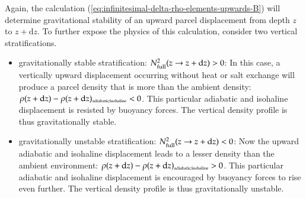 Again, the calculation
(\ref{eq:infinitesimal-delta-rho-elements-upwards-B}) will determine
gravitational stability of an upward parcel displacement from depth
$z$ to $z+\mathrm{d}z$.  To further expose the physics of this
calculation, consider two vertical stratifications.
\begin{itemize}
\item {\sc gravitationally stable stratification:
    $N^{2}_{\mbox{\scriptsize full}}(z \rightarrow z+\mathrm{d}z) >
    0$}: In this case, a vertically upward displacement occurring
  without heat or salt exchange will produce a parcel density that is
  more than the ambient density: $\rho(z+\mathrm{d} z) -
  \rho(z+\mathrm{d} z)_{\mbox{\tiny adiabatic/isohaline}} <0$. This
  particular adiabatic and isohaline displacement is resisted by
  buoyancy forces.  The vertical density profile is thus
  gravitationally stable.

\item {\sc gravitationally unstable stratification:
    $N^{2}_{\mbox{\scriptsize full}}(z \rightarrow z+\mathrm{d}z) <
    0$}: Now the upward adiabatic and isohaline displacement leads to
  a lesser density than the ambient environment: $\rho(z+\mathrm{d} z)
  - \rho(z+\mathrm{d} z)_{\mbox{\tiny adiabatic/isohaline}} >0$.  This
  particular adiabatic and isohaline displacement is encouraged by
  buoyancy forces to rise even further. The vertical density profile
  is thus gravitationally unstable.

\end{itemize}

